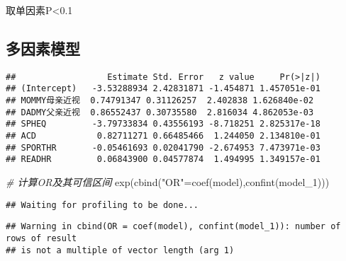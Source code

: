 \documentclass[]{ctexbook}
\newenvironment{Shaded}{\begin{snugshade}}{\end{snugshade}}
\newcommand{\AttributeTok}[1]{\textcolor[rgb]{0.77,0.63,0.00}{#1}}
\newcommand{\CommentTok}[1]{\textcolor[rgb]{0.56,0.35,0.01}{\textit{#1}}}
\newcommand{\FunctionTok}[1]{\textcolor[rgb]{0.00,0.00,0.00}{#1}}
\newcommand{\NormalTok}[1]{#1}
\newcommand{\OtherTok}[1]{\textcolor[rgb]{0.56,0.35,0.01}{#1}}
\newcommand{\SpecialCharTok}[1]{\textcolor[rgb]{0.00,0.00,0.00}{#1}}
\newcommand{\StringTok}[1]{\textcolor[rgb]{0.31,0.60,0.02}{#1}}
\begin{document}
取单因素P\textless0.1

\hypertarget{ux591aux56e0ux7d20ux6a21ux578b}{%
\subsection{多因素模型}\label{ux591aux56e0ux7d20ux6a21ux578b}}

\begin{Shaded}
\end{Shaded}

\begin{verbatim}
##                  Estimate Std. Error   z value     Pr(>|z|)
## (Intercept)   -3.53288934 2.42831871 -1.454871 1.457051e-01
## MOMMY母亲近视  0.74791347 0.31126257  2.402838 1.626840e-02
## DADMY父亲近视  0.86552437 0.30735580  2.816034 4.862053e-03
## SPHEQ         -3.79733834 0.43556193 -8.718251 2.825317e-18
## ACD            0.82711271 0.66485466  1.244050 2.134810e-01
## SPORTHR       -0.05461693 0.02041790 -2.674953 7.473971e-03
## READHR         0.06843900 0.04577874  1.494995 1.349157e-01
\end{verbatim}

\begin{Shaded}
\begin{Highlighting}[]
\CommentTok{\# 计算OR及其可信区间}
\FunctionTok{exp}\NormalTok{(}\FunctionTok{cbind}\NormalTok{(}\StringTok{"OR"}\OtherTok{=}\FunctionTok{coef}\NormalTok{(model),}\FunctionTok{confint}\NormalTok{(model\_1)))}
\end{Highlighting}
\end{Shaded}

\begin{verbatim}
## Waiting for profiling to be done...
\end{verbatim}

\begin{verbatim}
## Warning in cbind(OR = coef(model), confint(model_1)): number of rows of result
## is not a multiple of vector length (arg 1)
\end{verbatim}
\end{document}
